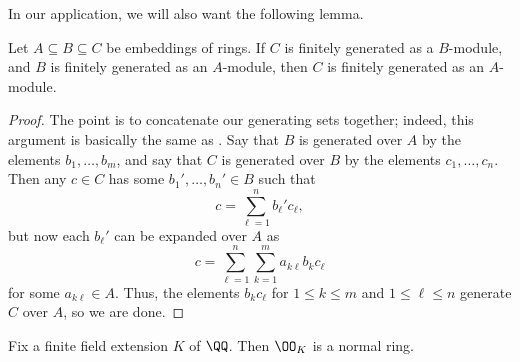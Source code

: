 \documentclass[../notes.tex]{subfiles}
\begin{document}
In our application, we will also want the following lemma.
\begin{lemma} \label{lem:finite-extension-transitive}
	Let $A\subseteq B\subseteq C$ be embeddings of rings. If $C$ is finitely generated as a $B$-module, and $B$ is finitely generated as an $A$-module, then $C$ is finitely generated as an $A$-module.
\end{lemma}
\begin{proof}
	The point is to concatenate our generating sets together; indeed, this argument is basically the same as . Say that $B$ is generated over $A$ by the elements $b_1,\ldots,b_m$, and say that $C$ is generated over $B$ by the elements $c_1,\ldots,c_n$. Then any $c\in C$ has some $b_1',\ldots,b_n'\in B$ such that
	\[c=\sum_{\ell=1}^nb_\ell'c_\ell,\]
	but now each $b_\ell'$ can be expanded over $A$ as
	\[c=\sum_{\ell=1}^n\sum_{k=1}^ma_{k\ell}b_kc_\ell\]
	for some $a_{k\ell}\in A$. Thus, the elements $b_kc_\ell$ for $1\le k\le m$ and $1\le\ell\le n$ generate $C$ over $A$, so we are done.
\end{proof}
\begin{corollary}
	Fix a finite field extension $K$ of $\QQ$. Then $\OO_K$ is a normal ring.
\end{corollary}
\end{document}
